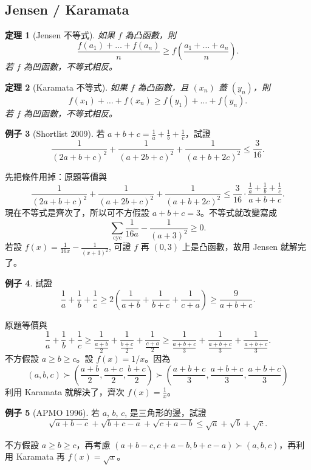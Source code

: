 \documentclass[11pt,nothm]{scrartcl}
\newtheorem{theorem}{\color{blue!40!black}定理}
\theoremstyle{definition}
\newtheorem{example}[theorem]{\color{blue!40!black}例子}
\let\oldendproof\endproof
\renewenvironment{proof}[1][【證】]{%
  \oldproof[\bfseries #1\nopunct]%
}{\oldendproof}
\begin{document}
\subsection{Jensen / Karamata}
\begin{theorem}
  [Jensen 不等式] 如果 $f$ 為凸函數，則
  \[ \frac{f(a_1) + \dots + f(a_n)}{n} \ge f\left( \frac{a_1+\dots+a_n}{n} \right). \]
  若 $f$ 為凹函數，不等式相反。
\end{theorem}
\begin{theorem}
  [Karamata 不等式] 如果 $f$ 為凸函數，且 $(x_n)$ 蓋 $(y_n)$，則
  \[ f(x_1) + \dots + f(x_n) \ge f(y_1) + \dots + f(y_n). \]
  若 $f$ 為凹函數，不等式相反。
\end{theorem}
\begin{example}
  [Shortlist 2009] 若 $a+b+c=\frac1a+\frac1b+\frac1c$，試證
  \[ \frac{1}{(2a+b+c)^2}+\frac{1}{(a+2b+c)^2}+\frac{1}{(a+b+2c)^2}\leq\frac{3}{16}. \]
\end{example}
\begin{proof}
  先把條件用掉：原題等價與
  \[ \frac{1}{(2a+b+c)^2}+\frac{1}{(a+2b+c)^2}+\frac{1}{(a+b+2c)^2}\leq\frac{3}{16} \cdot \frac{\frac1a+\frac1b+\frac1c}{a+b+c}. \]
  現在不等式是齊次了，所以可不方假設 $a+b+c=3$。不等式就改變寫成
  \[ \sum_{\text{cyc}} \frac{1}{16a} - \frac{1}{(a+3)^2} \ge 0. \]
  若設 $f(x) = \frac{1}{16x} - \frac{1}{(x+3)^2}$, 可證 $f$ 再 $(0,3)$ 上是凸函數，故用 Jensen 就解完了。
\end{proof}
\begin{example}
  試證 \[ \frac{1}{a}+\frac{1}{b}+\frac{1}{c}\geq2\left(\frac{1}{a+b}+\frac{1}{b+c}+\frac{1}{c+a}\right)\geq\frac{9}{a+b+c}.
  \]
\end{example}
\begin{proof}
  原題等價與
  \[ \frac{1}{a} + \frac{1}{b} + \frac{1}{c} \ge \frac{1}{\frac{a+b}{2}} + \frac{1}{\frac{b+c}{2}} + \frac{1}{\frac{c+a}{2}} \ge \frac{1}{\frac{a+b+c}{3}} + \frac{1}{\frac{a+b+c}{3}} + \frac{1}{\frac{a+b+c}{3}}. \]
  不方假設 $a \ge b \ge c$。設 $f(x) = 1/x$。因為
  \[ (a,b,c) \succ \left( \frac{a+b}{2}, \frac{a+c}{2}, \frac{b+c}{2} \right) \succ \left( \frac{a+b+c}{3}, \frac{a+b+c}{3}, \frac{a+b+c}{3} \right) \]
  利用 Karamata 就解決了，齊次 $f(x) = \frac 1x$。
\end{proof}
\begin{example}
  [APMO 1996] 若 $a$, $b$, $c$, 是三角形的邊，試證 \[
  \sqrt{a+b-c}+\sqrt{b+c-a}+\sqrt{c+a-b}\leq\sqrt{a}+\sqrt{b}+\sqrt{c}. \]
\end{example}
\begin{proof}
  不方假設 $a \ge b \ge c$，再考慮 $(a+b-c, c+a-b, b+c-a) \succ (a,b,c)$，再利用 Karamata 再 $f(x) = \sqrt x$。
\end{proof}
\end{document}
